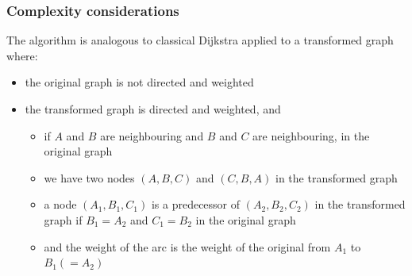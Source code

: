 \begin{frame}
  \frametitle{Complexity considerations}
  The algorithm is analogous to classical \alert{Dijkstra} applied to a
  \alert{transformed} graph where:\pause
  \begin{itemize}
  \item the original graph is \alert{not} directed and weighted\pause
  \item the transformed graph is \alert{directed} and weighted,
    and\pause
    \begin{itemize}
    \item if \alert{$A$} and \alert{$B$} are \alert{neighbouring} and
      \alert{$B$} and \alert{$C$} are \alert{neighbouring}, in the original graph\pause
    \item we have two nodes \alert{$(A,B,C)$} and
      \alert{$(C,B,A)$} in the transformed graph\pause
    \item a node \alert{$(A_1,B_1,C_1)$} is a predecessor of
      \alert{$(A_2,B_2,C_2)$} in the transformed graph if
      \alert{$B_1=A_2$} and \alert{$C_1=B_2$} in the original graph\pause
    \item and the weight of the arc is the weight of the original from
      \alert{$A_1$} to \alert{$B_1(=A_2)$}
    \end{itemize}
  \end{itemize}
\end{frame}


